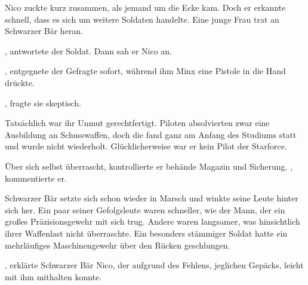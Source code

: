 \par

Nico zuckte kurz zusammen, als jemand um die Ecke kam. Doch er erkannte schnell, dass es sich um weitere Soldaten handelte. Eine junge Frau trat an Schwarzer Bär heran. 

\par

, antwortete der Soldat.  Dann sah er Nico an. 

\par

, entgegnete der Gefragte sofort, während ihm Minx eine Pistole in die Hand drückte.

\par

, fragte sie skeptisch.

\par

Tatsächlich war ihr Unmut gerechtfertigt. Piloten absolvierten zwar eine Ausbildung an Schusswaffen, doch die fand ganz am Anfang des Studiums statt und wurde nicht wiederholt. Glücklicherweise war er kein Pilot der Starforce.

\par

Über sich selbst überrascht, kontrollierte er behände Magazin und Sicherung. , kommentierte er.

\par

Schwarzer Bär setzte sich schon wieder in Marsch und winkte seine Leute hinter sich her. Ein paar seiner Gefolgsleute waren schneller, wie der Mann, der ein großes Präzisionsgewehr mit sich trug. Andere waren langsamer, was hinsichtlich ihrer Waffenlast nicht überraschte. Ein besonders stämmiger Soldat hatte ein mehrläufiges Maschinengewehr über den Rücken geschlungen.

\par

, erklärte Schwarzer Bär Nico, der aufgrund des Fehlens, jeglichen Gepäcks, leicht mit ihm mithalten konnte. 

